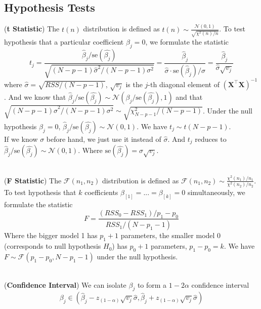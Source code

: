 \documentclass[a4paper, 11pt]{article}
\begin{document}
\subsection{Hypothesis Tests}
(\textbf{t Statistic}) The $t(n)$ distribution is defined as $t(n)\sim \frac{\mathcal{N}(0,1)}{\sqrt{\chi^2(n)/n}}$. To test hypothesis that a particular coefficient $\beta_j=0$, we formulate the statistic
$$
t_j = \frac{\hat{\beta}_j/\mathrm{se}(\hat{\beta_j})}{\sqrt{(N-p-1)\hat{\sigma}^2/(N-p-1)\sigma^2}} = \frac{\hat{\beta}_j}{\hat{\sigma} \cdot \mathrm{se}(\hat{\beta}_j)/\sigma} = \frac{\hat{\beta}_j}{\hat{\sigma} \sqrt{v_j}}
$$
where $\hat{\sigma}=\sqrt{RSS/(N-p-1)}$, $\sqrt{v_j}$ is the $j$-th diagonal element of $(\bm{X}^{\top} \bm{X})^{-1}$. And we know that $\hat{\beta}_j/\mathrm{se}(\hat{\beta_j})\sim \mathcal{N}(\beta_j/\mathrm{se}(\hat{\beta_j}),1)$ and that $\sqrt{(N-p-1)\hat{\sigma}^2/(N-p-1)\sigma^2}\sim \sqrt{\chi^2_{N-p-1}/(N-p-1)}$. Under the null hypothesis $\beta_j=0$, $\hat{\beta}_j/\mathrm{se}(\hat{\beta_j})\sim \mathcal{N}(0,1)$. We have $t_j \sim t(N-p-1)$. 
~\\ 
If we know $\sigma$ before hand, we just use it instead of $\hat{\sigma}$. And $t_j$ reduces to $\hat{\beta}_j/\mathrm{se}(\hat{\beta_j})\sim \mathcal{N}(0,1)$. Where $\mathrm{se}(\hat{\beta_j}) = \sigma \sqrt{v_j}$.

~\\
(\textbf{F Statistic}) The $\mathcal{F}(n_1, n_2)$ distribution is defined as $\mathcal{F}(n_1, n_2)\sim \frac{\chi^2(n_1)/n_1}{\chi^2(n_2)/n_2}$. To test hypothesis that $k$ coefficients $\beta_{[1]}=...=\beta_{[k]}=0$ simultaneously, we formulate the statistic
$$
F = \frac{(RSS_0 - RSS_1)/p_1-p_0}{RSS_1/(N-p_1-1)}
$$
Where the bigger model 1 has $p_1+1$ parameters, the smaller model 0 (corresponds to null hypothesis $H_0$) has $p_0+1$ parameters, $p_1-p_0=k$. We have $F\sim \mathcal{F}(p_1-p_0, N-p_1-1)$ under the null hypothesis.

~\\
(\textbf{Confidence Interval}) We can isolate $\beta_j$ to form a $1-2\alpha$ confidence interval
$$
\beta_j \in (\hat{\beta}_j-z_{(1-\alpha)} \sqrt{v_j}\hat{\sigma}, \hat{\beta}_j+z_{(1-\alpha)} \sqrt{v_j}\hat{\sigma})
$$
\end{document}
